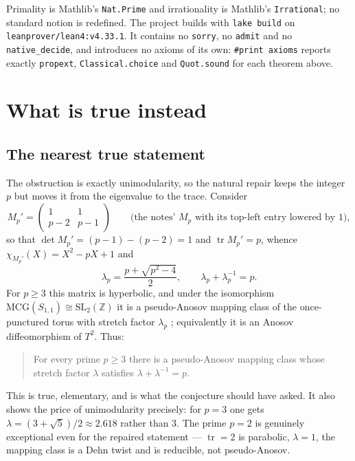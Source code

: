 \documentclass[11pt]{article}
\theoremstyle{plain}
\theoremstyle{definition}
\theoremstyle{remark}
\newcommand{\ZZ}{\mathbb{Z}}
\begin{document}
Primality is Mathlib's \texttt{Nat.Prime} and irrationality is Mathlib's
\texttt{Irrational}; no standard notion is redefined. The project builds with
\texttt{lake build} on \texttt{leanprover/lean4:v4.33.1}. It contains no
\texttt{sorry}, no \texttt{admit} and no \texttt{native\_decide}, and introduces no
axioms of its own: \texttt{\#print axioms} reports exactly \texttt{propext},
\texttt{Classical.choice} and \texttt{Quot.sound} for each theorem above.

\section{What is true instead}

\subsection{The nearest true statement}\label{sec:repair}

The obstruction is exactly unimodularity, so the natural repair keeps the integer
$p$ but moves it from the eigenvalue to the trace. Consider
\[
  M_{p}'=\begin{pmatrix}1&1\\p-2&p-1\end{pmatrix}
  \qquad\text{(the notes' } M_{p}\text{ with its top-left entry lowered by }1),
\]
so that $\det M_{p}'=(p-1)-(p-2)=1$ and $\operatorname{tr}M_{p}'=p$, whence
$\chi_{M_{p}'}(X)=X^{2}-pX+1$ and
\[
  \lambda_{p}=\frac{p+\sqrt{p^{2}-4}}{2},\qquad \lambda_{p}+\lambda_{p}^{-1}=p .
\]
For $p\ge3$ this matrix is hyperbolic, and under the isomorphism
$\mathrm{MCG}(S_{1,1})\cong\mathrm{SL}_{2}(\ZZ)$ it is a pseudo-Anosov mapping
class of the once-punctured torus with stretch factor $\lambda_{p}$
\cite[\S13.1]{FM}; equivalently it is an Anosov diffeomorphism of $T^{2}$. Thus:

\begin{quote}
For every prime $p\ge3$ there is a pseudo-Anosov mapping class whose stretch
factor $\lambda$ satisfies $\lambda+\lambda^{-1}=p$.
\end{quote}

This is true, elementary, and is what the conjecture should have asked. It also
shows the price of unimodularity precisely: for $p=3$ one gets
$\lambda=(3+\sqrt5)/2\approx2.618$ rather than $3$. The prime $p=2$ is genuinely
exceptional even for the repaired statement --- $\operatorname{tr}=2$ is parabolic,
$\lambda=1$, the mapping class is a Dehn twist and is reducible, not pseudo-Anosov.
\end{document}
